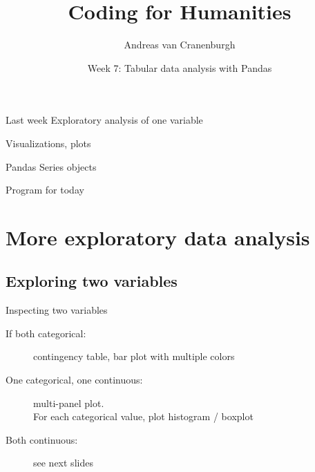 \documentclass[aspectratio=169,usenames,dvipsnames]{beamer}
\title{Coding for Humanities}
\author{Andreas van Cranenburgh}
\date{Week 7: Tabular data analysis with Pandas}
\begin{document}
\maketitle


\begin{frame}{Last week}
    Exploratory analysis of one variable

    \vspace{1em}
    Visualizations, plots

    \vspace{1em}
    Pandas Series objects
\end{frame}

\begin{frame}{Program for today}
\tableofcontents
\end{frame}



\section{More exploratory data analysis}
\subsection{Exploring two variables}
\frame{\tableofcontents[currentsubsection]}

\begin{frame}{Inspecting two variables}
\begin{description}
    \item[If both categorical:]
            contingency table, bar plot with multiple colors
    \item[One categorical, one continuous:] multi-panel plot. \\
            For each categorical value, plot histogram / boxplot
    \item[Both continuous:]
        see next slides
\end{description}
\end{frame}
\end{document}
